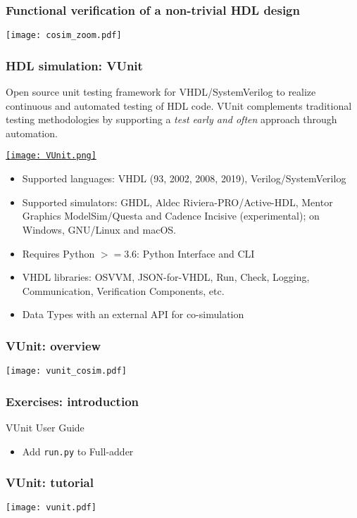 \documentclass[xcolor={usenames,dvipsnames,svgnames}]{beamer}
\begin{document}
\begin{frame}
\frametitle{Functional verification of a non-trivial HDL design}
\centering
\texttt{[image: cosim\_zoom.pdf]}
\end{frame}

\begin{frame}
\frametitle{HDL simulation: VUnit}
\small
Open source unit testing framework for VHDL/SystemVerilog to realize continuous and automated testing of HDL code. VUnit complements traditional testing methodologies by supporting a \emph{test early and often} approach through automation.

\vfill
\href{https://vunit.github.io/}{\texttt{[image: VUnit.png]}}
\vfill

\tiny
\begin{itemize}
  \item Supported languages: VHDL (93, 2002, 2008, 2019), Verilog/SystemVerilog
  \item Supported simulators: GHDL, Aldec Riviera-PRO/Active-HDL, Mentor Graphics ModelSim/Questa and Cadence Incisive (experimental); on Windows, GNU/Linux and macOS.
  \item Requires Python $>=3.6$: Python Interface and CLI
  \item VHDL libraries: OSVVM, JSON-for-VHDL, Run, Check, Logging, Communication, Verification Components, etc.
  \item Data Types with an external API for co-simulation
\end{itemize}
\end{frame}

\begin{frame}
\frametitle{VUnit: overview}
\centering
\texttt{[image: vunit\_cosim.pdf]}
\end{frame}

\begin{frame}
\frametitle{Exercises: introduction}
\vfill
\begin{center}
VUnit User Guide \href{http://vunit.github.io/user_guide.html}{\faBook}
\end{center}
\vfill
\begin{itemize}
  \item Add \lstinline{run.py} to Full-adder
\end{itemize}
\vfill
\end{frame}

\begin{frame}
\frametitle{VUnit: tutorial}
\centering
\texttt{[image: vunit.pdf]}
\end{frame}
\end{document}
